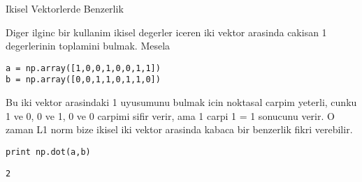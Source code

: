\documentclass[12pt,fleqn]{article}\usepackage{../common}
\begin{document}
Ikisel Vektorlerde Benzerlik

Diger ilginc bir kullanim ikisel degerler iceren iki vektor arasinda
cakisan 1 degerlerinin toplamini bulmak. Mesela 

\begin{verbatim}
a = np.array([1,0,0,1,0,0,1,1])
b = np.array([0,0,1,1,0,1,1,0])
\end{verbatim}

Bu iki vektor arasindaki 1 uyusumunu bulmak icin noktasal carpim yeterli,
cunku 1 ve 0, 0 ve 1, 0 ve 0 carpimi sifir verir, ama 1 carpi 1 = 1
sonucunu verir. O zaman L1 norm bize ikisel iki vektor arasinda kabaca bir
benzerlik fikri verebilir.

\begin{verbatim}
print np.dot(a,b)
\end{verbatim}

\begin{verbatim}
2
\end{verbatim}
\end{document}

